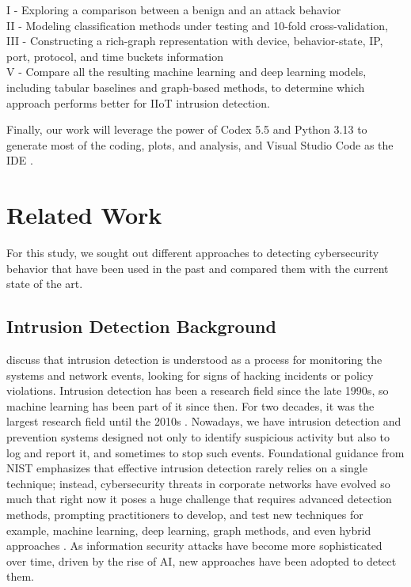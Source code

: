 \documentclass[final,5p,times,twocolumn]{elsarticle}
\begin{document}
\begin{flushleft}
I - Exploring a comparison between a benign and an attack behavior\\
II - Modeling classification methods under testing and 10-fold cross-validation,\\
III - Constructing a rich-graph representation with device, behavior-state, IP, port, protocol, and time buckets information\\
V - Compare all the resulting machine learning and deep learning models, including tabular baselines and graph-based methods, to determine which approach performs better for IIoT intrusion detection.
\end{flushleft}

Finally, our work will leverage the power of Codex 5.5 and Python 3.13 to generate most of the coding, plots, and analysis, and Visual Studio Code as the IDE \citep{openai_gpt54_2026,vscode_2026}. 

\section{Related Work}
\label{sec:related_work}

For this study, we sought out different approaches to detecting cybersecurity behavior that have been used in the past and compared them with the current state of the art.

\subsection{Intrusion Detection Background}

\cite{scarfone2007guide} discuss that intrusion detection is understood as a process for monitoring the systems and network events, looking for signs of hacking incidents or policy violations. Intrusion detection has been a research field since the late 1990s, so machine learning has been part of it since then. For two decades, it was the largest research field until the 2010s \citep{gokstorp_machine_2026}. Nowadays, we have intrusion detection and prevention systems designed not only to identify suspicious activity but also to log and report it, and sometimes to stop such events. Foundational guidance from NIST \citep{scarfone2007guide} emphasizes that effective intrusion detection rarely relies on a single technique; instead, cybersecurity threats in corporate networks have evolved so much that right now it poses a huge challenge that requires advanced detection methods, prompting practitioners to develop, and test new techniques for example, machine learning, deep learning, graph methods, and even hybrid approaches \citep{hwang2026cgllm,alharthi2025comparative,bilot2023graph}. As information security attacks have become more sophisticated over time, driven by the rise of AI, new approaches have been adopted to detect them.
\end{document}
